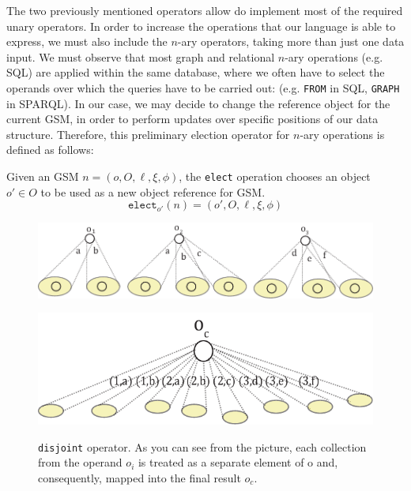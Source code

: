 The two previously mentioned operators allow do implement most of the required unary operators. In order to increase the operations that our language is able to express, we must also include the $n$-ary operators, taking more than just one data input.  We must observe that most graph \cite{apacheflink} and relational $n$-ary operations (e.g. SQL) are applied within the same database, where we often have to select the operands over which the queries have to be carried out: (e.g. \texttt{FROM} in SQL, \texttt{GRAPH} in SPARQL). In our case, we may decide to change the reference object for the current GSM, in order to perform updates over specific positions of our data structure. Therefore, this preliminary election operator for $n$-ary operations is defined as follows:

\begin{definition}[Elect]\label{gsql:elect}
Given an GSM $n=(o,O,\ell,\xi,\phi)$,  the \texttt{elect} operation chooses an object $o'\in O$ to be used as a new object reference for GSM.
\[\texttt{elect}_{o'}(n)=(o',O,\ell,\xi,\phi)\]
\end{definition}

\begin{figure}[!t]
	\centering
  \begin{minipage}[t]{0.9\textwidth}
	 \centering
	\includegraphics[scale=0.8]{fig/05language/01disjoint_input.pdf}
	\label{fig:disjoperands}
\end{minipage}
\begin{minipage}[t]{0.6\textwidth}
	\centering
	\includegraphics[scale=0.8]{fig/05language/02disjoint_output.pdf}
	\label{fig:disjsol}
\end{minipage}
\caption{\texttt{disjoint} operator. As you can see from the picture, each collection from the operand $o_i$ is treated as a separate element of o and, consequently, mapped into the final result $o_c$.}
\label{fig:disjoint}
\end{figure}

